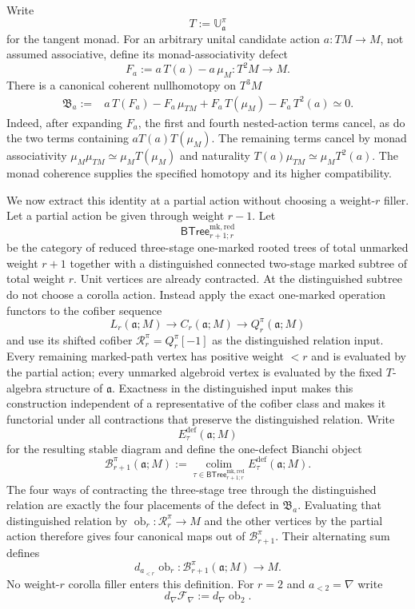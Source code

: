 \begin{construction}
\label{con:as-bianchi-boundary}
Write
\[
    T:=\mathbb U_{\mathfrak a}^{\pi}
\]
for the tangent monad.  For an arbitrary unital candidate action
$a:TM\to M$, not assumed associative, define its monad-associativity defect
\[
\boxed{
    F_a
    :=
    a\,T(a)-a\,\mu_M:
    T^2M\longrightarrow M.
}
\]
There is a canonical coherent nullhomotopy on $T^3M$
\[
\boxed{
\begin{aligned}
    \mathfrak B_a
    :={}&
    a\,T(F_a)
    -F_a\,\mu_{TM}
    +F_a\,T(\mu_M)
    -F_a\,T^2(a)
    \simeq0.
\end{aligned}}
\]
Indeed, after expanding $F_a$, the first and fourth nested-action terms cancel,
as do the two terms containing $aT(a)T(\mu_M)$.  The remaining terms cancel
by monad associativity
$\mu_M\mu_{TM}\simeq\mu_MT(\mu_M)$ and naturality
$T(a)\mu_{TM}\simeq\mu_MT^2(a)$.  The monad coherence supplies the specified
homotopy and its higher compatibility.

We now extract this identity at a partial action without choosing a
weight-$r$ filler.  Let a partial action be given through weight $r-1$.  Let
\[
    \mathsf{BTree}^{\mathrm{mk,red}}_{r+1;r}
\]
be the category of reduced three-stage one-marked rooted trees of total
unmarked weight $r+1$ together with a distinguished connected two-stage
marked subtree of total weight $r$.  Unit vertices are already contracted.
At the distinguished subtree do not choose a corolla action.  Instead apply
the exact one-marked operation functors to the cofiber sequence
\[
    L_r(\mathfrak a;M)
    \longrightarrow
    C_r(\mathfrak a;M)
    \longrightarrow
    Q_r^\pi(\mathfrak a;M)
\]
and use its shifted cofiber
$\mathcal R_r^\pi=Q_r^\pi[-1]$ as the distinguished relation input.  Every
remaining marked-path vertex has positive weight $<r$ and is evaluated by the
partial action; every unmarked algebroid vertex is evaluated by the fixed
$T$-algebra structure of $\mathfrak a$.  Exactness in the distinguished input
makes this construction independent of a representative of the cofiber
class and makes it functorial under all contractions that preserve the
distinguished relation.  Write
\[
    E^{\mathrm{def}}_\tau(\mathfrak a;M)
\]
for the resulting stable diagram and define the one-defect Bianchi object
\[
\boxed{
    \mathcal B_{r+1}^\pi(\mathfrak a;M)
    :=
    \operatorname*{colim}_{
      \tau\in\mathsf{BTree}^{\mathrm{mk,red}}_{r+1;r}}
    E^{\mathrm{def}}_\tau(\mathfrak a;M).
}
\]
The four ways of contracting the three-stage tree through the distinguished
relation are exactly the four placements of the defect in
$\mathfrak B_a$.  Evaluating that distinguished relation by
$\operatorname{ob}_r:\mathcal R_r^\pi\to M$ and the other vertices by the
partial action therefore gives four canonical maps out of
$\mathcal B_{r+1}^\pi$.  Their alternating sum defines
\[
\boxed{
    d_{a_{<r}}\operatorname{ob}_r:
    \mathcal B_{r+1}^\pi(\mathfrak a;M)
    \longrightarrow M.
}
\]
No weight-$r$ corolla filler enters this definition.  For $r=2$ and
$a_{<2}=\nabla$ write
\[
    d_\nabla\mathcal F_\nabla
    :=
    d_{\nabla}\operatorname{ob}_2.
\]
\end{construction}

